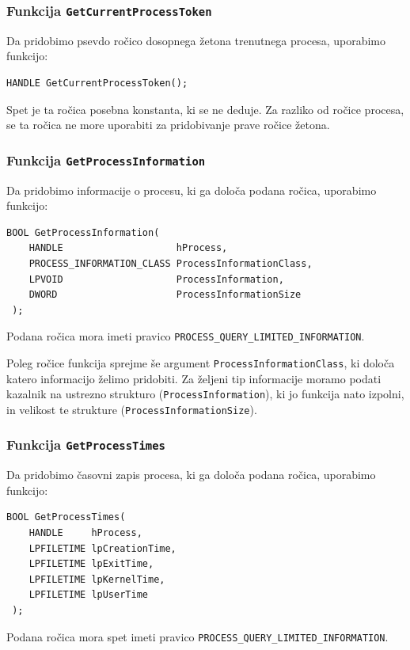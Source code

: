 \documentclass[a4paper,12pt,openright]{book}
\begin{document}
\subsubsection{Funkcija \texttt{GetCurrentProcessToken}}

Da pridobimo psevdo ročico dosopnega žetona trenutnega procesa, uporabimo funkcijo:
\begin{lstlisting}[style=func]
 HANDLE GetCurrentProcessToken();
\end{lstlisting}

Spet je ta ročica posebna konstanta, ki se ne deduje.
Za razliko od ročice procesa, se ta ročica ne more uporabiti za pridobivanje prave ročice žetona.

\subsubsection{Funkcija \texttt{GetProcessInformation}}

Da pridobimo informacije o procesu, ki ga določa podana ročica, uporabimo funkcijo:
\begin{lstlisting}[style=func]
 BOOL GetProcessInformation(
	HANDLE                    hProcess,
	PROCESS_INFORMATION_CLASS ProcessInformationClass,
	LPVOID                    ProcessInformation,
	DWORD                     ProcessInformationSize
 );
\end{lstlisting}

Podana ročica mora imeti pravico \texttt{PROCESS\_QUERY\_LIMITED\_INFORMATION}.

Poleg ročice funkcija sprejme še argument \texttt{ProcessInformationClass}, ki določa katero informacijo želimo pridobiti.
Za željeni tip informacije moramo podati kazalnik na ustrezno strukturo (\texttt{ProcessInformation}), ki jo funkcija nato izpolni, in velikost te strukture (\texttt{ProcessInformationSize}).

\subsubsection{Funkcija \texttt{GetProcessTimes}}

Da pridobimo časovni zapis procesa, ki ga določa podana ročica, uporabimo funkcijo:
\begin{lstlisting}[style=func]
 BOOL GetProcessTimes(
	HANDLE     hProcess,
	LPFILETIME lpCreationTime,
	LPFILETIME lpExitTime,
	LPFILETIME lpKernelTime,
	LPFILETIME lpUserTime
 );
\end{lstlisting}

Podana ročica mora spet imeti pravico \texttt{PROCESS\_QUERY\_LIMITED\-\_INFOR\-MATION}.
\end{document}
